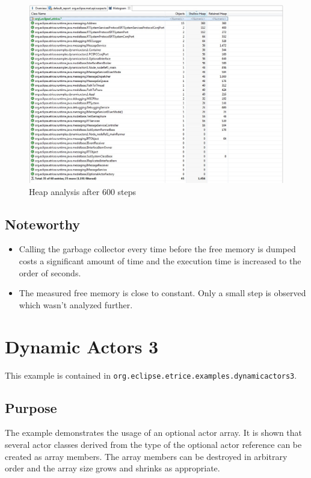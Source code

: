 \begin{figure}
\includegraphics[scale=0.45]{images/039-DynAct2-HeapAnalysis.jpg}
\caption{Heap analysis after 600 steps}
\label{fig:dynact2_heap}
\end{figure}

\subsection{Noteworthy}

\begin{itemize}
\item Calling the garbage collector every time before the free memory is dumped
costs a significant amount of time and the execution time is increased to the order of seconds.
\item The measured free memory is close to constant. Only a small step is observed which wasn't analyzed further.
\end{itemize}

\section{Dynamic Actors 3}

This example is contained in \texttt{org.eclipse.etrice.examples.dynamicactors3}.

\subsection{Purpose}

The example demonstrates the usage of an optional actor array. It is shown that several actor classes
derived from the type of the optional actor reference can be created as array members.
The array members can be destroyed in arbitrary order and the array size grows and shrinks as appropriate.

